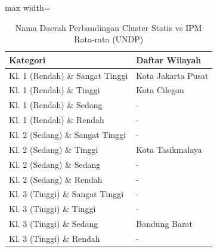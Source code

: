 \begin{table}[H]
\centering
\caption{Nama Daerah Perbandingan Cluster Statis vs IPM Rata-rata (UNDP)} \label{tab:samplestatis_ipm_avg_name}
\begin{adjustbox}{max width=\textwidth}
\begin{tabular}{|p{4cm}|p{10cm}|}
\hline
\textbf{Kategori} & \textbf{Daftar Wilayah} \\
\hline
Kl. 1 (Rendah) \& Sangat Tinggi & Kota Jakarta Pusat \\
\hline
Kl. 1 (Rendah) \& Tinggi & Kota Cilegon \\
\hline
Kl. 1 (Rendah) \& Sedang & - \\
\hline
Kl. 1 (Rendah) \& Rendah & - \\
\hline
Kl. 2 (Sedang) \& Sangat Tinggi & - \\
\hline
Kl. 2 (Sedang) \& Tinggi & Kota Tasikmalaya \\
\hline
Kl. 2 (Sedang) \& Sedang & - \\
\hline
Kl. 2 (Sedang) \& Rendah & - \\
\hline
Kl. 3 (Tinggi) \& Sangat Tinggi & - \\
\hline
Kl. 3 (Tinggi) \& Tinggi & - \\
\hline
Kl. 3 (Tinggi) \& Sedang & Bandung Barat \\
\hline
Kl. 3 (Tinggi) \& Rendah & - \\
\hline
\end{tabular}
\end{adjustbox}
\end{table}